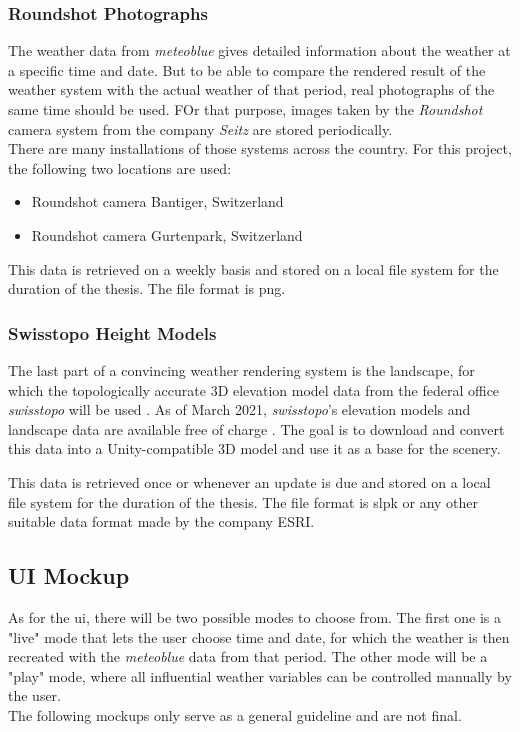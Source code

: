 \subsubsection{Roundshot Photographs}
The weather data from \emph{meteoblue} gives detailed information about the weather at a specific time and date.
But to be able to compare the rendered result of the weather system with the actual weather of that period, real photographs of the same time should be used.
FOr that purpose, images taken by the \emph{Roundshot} camera system from the company \emph{Seitz} \cite{roundshot} are stored periodically.
\\
There are many installations of those systems across the country. For this project, the following two locations are used: 
\begin{itemize}
    \item Roundshot camera Bantiger, Switzerland \cite{bantiger}
    \item Roundshot camera Gurtenpark, Switzerland \cite{gurtenpark}
\end{itemize}

\noindent
This data is retrieved on a weekly basis and stored on a local file system for the duration of the thesis. The file format is \gls{png}.

\subsubsection{Swisstopo Height Models}
The last part of a convincing weather rendering system is the landscape, for which the topologically accurate 3D elevation model data from the federal office \emph{swisstopo} will be used \cite{swisstopo}.
As of March 2021, \emph{swisstopo}'s elevation models and landscape data are available free of charge \cite{swisstopo:free}.
The goal is to download and convert this data into a Unity-compatible 3D model and use it as a base for the scenery.

\noindent
This data is retrieved once or whenever an update is due and stored on a local file system for the duration of the thesis. The file format is \gls{slpk} or any other suitable data format made by the company ESRI.

\clearpage

\subsection{UI Mockup}
\label{section:vision:ui}
As for the \gls{ui}, there will be two possible modes to choose from.
The first one is a "live" mode that lets the user choose time and date, for which the weather is then recreated with the \emph{meteoblue} data from that period.
The other mode will be a "play" mode, where all influential weather variables can be controlled manually by the user.
\\
The following mockups only serve as a general guideline and are not final.

